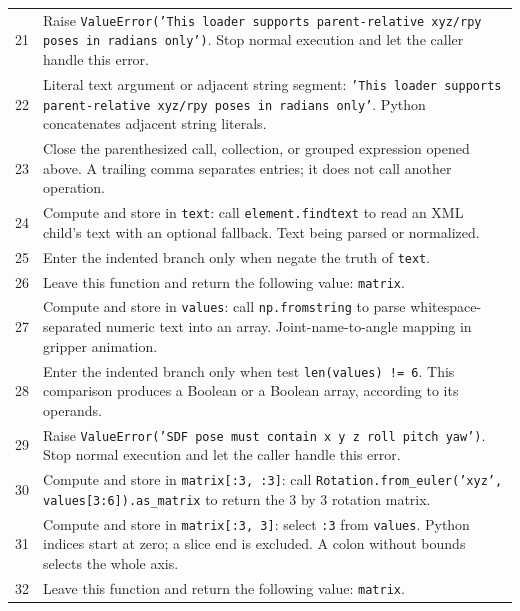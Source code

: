 \documentclass[11pt,a4paper]{book}
\begin{document}
\begin{longtable}{r p{}}
21 & Raise \texttt{ValueError('This loader supports parent-relative xyz/rpy poses in radians only')}. Stop normal execution and let the caller handle this error. \\

22 & Literal text argument or adjacent string segment: \texttt{'This loader supports parent-relative xyz/rpy poses in radians only'}. Python concatenates adjacent string literals. \\

23 & Close the parenthesized call, collection, or grouped expression opened above. A trailing comma separates entries; it does not call another operation. \\

24 & Compute and store in \texttt{text}: call \texttt{element.findtext} to read an XML child's text with an optional fallback. Text being parsed or normalized. \\

25 & Enter the indented branch only when negate the truth of \texttt{text}. \\

26 & Leave this function and return the following value: \texttt{matrix}. \\

27 & Compute and store in \texttt{values}: call \texttt{np.fromstring} to parse whitespace-separated numeric text into an array. Joint-name-to-angle mapping in gripper animation. \\

28 & Enter the indented branch only when test \texttt{len(values) != 6}. This comparison produces a Boolean or a Boolean array, according to its operands. \\

29 & Raise \texttt{ValueError('SDF pose must contain x y z roll pitch yaw')}. Stop normal execution and let the caller handle this error. \\

30 & Compute and store in \texttt{matrix[:3, :3]}: call \texttt{Rotation.from\_euler('xyz', values[3:6]).as\_matrix} to return the 3 by 3 rotation matrix.  \\

31 & Compute and store in \texttt{matrix[:3, 3]}: select \texttt{:3} from \texttt{values}. Python indices start at zero; a slice end is excluded. A colon without bounds selects the whole axis.  \\

32 & Leave this function and return the following value: \texttt{matrix}. \\

\end{longtable}
\end{document}
